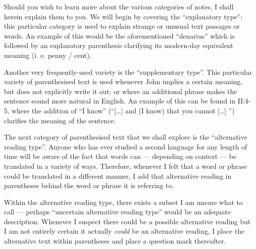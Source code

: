 Should you wish to learn more about the various categories of notes, I shall herein explain them to you. We will begin by covering the ``explanatory type''; this particular category is used to explain strange or unusual text passages or words. An example of this would be the aforementioned ``denarius'' which is followed by an explanatory parenthesis clarifying its modern-day equivalent meaning (i. e. penny / cent). 

Another very frequently-used variety is the ``supplementary type''. This particular variety of parenthesised text is used whenever John implies a certain meaning, but does not explicitly write it out; or where an additional phrase makes the sentence sound more natural in English. An example of this can be found in II:4-5, where the addition of ``I know'' (``[…] and (I know) that you cannot […] '') clarifies the meaning of the sentence. 

The next category of parenthesised text that we shall explore is the ``alternative reading type''. Anyone who has ever studied a second language for any length of time will be aware of the fact that words can — depending on context — be translated in a variety of ways. Therefore, whenever I felt that a word or phrase could be translated in a different manner, I add that alternative reading in parentheses behind the word or phrase it is referring to. 

Within the alternative reading type, there exists a subset I am unsure what to call — perhaps ``uncertain alternative reading type'' would be an adequate description. Whenever I suspect there could be a possible alternative reading but I am not entirely certain it actually \textit{could} be an alternative reading, I place the alternative text within parentheses and place a question mark thereafter. 
